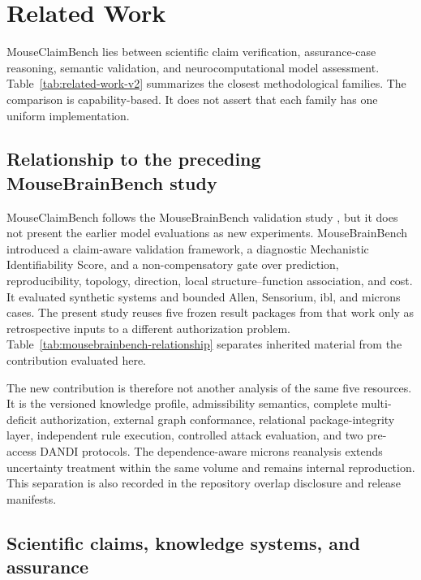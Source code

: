 \section{Related Work}
\label{sec:related-work}

MouseClaimBench lies between scientific claim verification, assurance-case reasoning, semantic validation, and neurocomputational model assessment. Table~\ref{tab:related-work-v2} summarizes the closest methodological families. The comparison is capability-based. It does not assert that each family has one uniform implementation.



\subsection{Relationship to the preceding MouseBrainBench study}
\label{subsec:mousebrainbench-relationship}

MouseClaimBench follows the MouseBrainBench validation study \citep{fernandezisabel2026mousebrainbench}, but it does not present the earlier model evaluations as new experiments. MouseBrainBench introduced a claim-aware validation framework, a diagnostic Mechanistic Identifiability Score, and a non-compensatory gate over prediction, reproducibility, topology, direction, local structure--function association, and cost. It evaluated synthetic systems and bounded Allen, Sensorium, \ac{ibl}, and \ac{microns} cases. The present study reuses five frozen result packages from that work only as retrospective inputs to a different authorization problem. Table~\ref{tab:mousebrainbench-relationship} separates inherited material from the contribution evaluated here.



The new contribution is therefore not another analysis of the same five resources. It is the versioned knowledge profile, admissibility semantics, complete multi-deficit authorization, external graph conformance, relational package-integrity layer, independent rule execution, controlled attack evaluation, and two pre-access DANDI protocols. The dependence-aware \ac{microns} reanalysis extends uncertainty treatment within the same volume and remains internal reproduction. This separation is also recorded in the repository overlap disclosure and release manifests.

\subsection{Scientific claims, knowledge systems, and assurance}
\label{subsec:claims-assurance}

